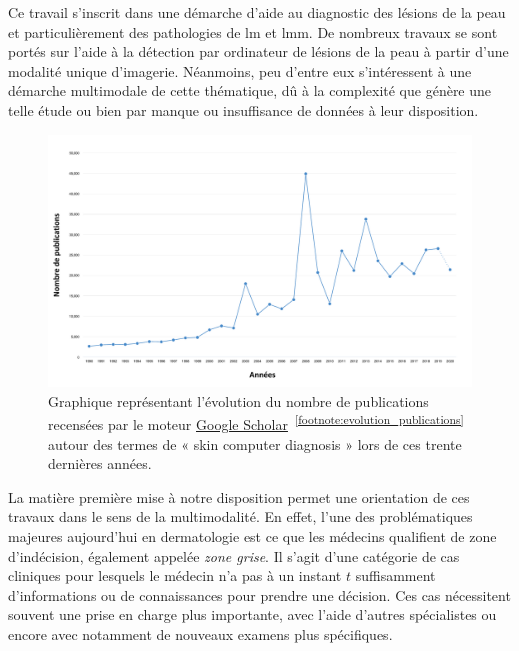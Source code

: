 Ce travail s'inscrit dans une démarche d'aide au diagnostic des lésions de la peau et particulièrement des pathologies de \gls{lm} et \gls{lmm}. De nombreux travaux se sont portés sur l'aide à la détection par ordinateur de lésions de la peau à partir d'une modalité unique d'imagerie. Néanmoins, peu d'entre eux s'intéressent à une démarche multimodale de cette thématique, dû à la complexité que génère une telle étude ou bien par manque ou insuffisance de données à leur disposition.\par

\begin{figure}[H]
    \centering
    \includegraphics[width=\linewidth]{contents/i_introduction/resources/evolution_publications.pdf}
    \caption{Graphique représentant l'évolution du nombre de publications recensées par le moteur \href{https://scholar.google.fr/}{Google Scholar}~\textsuperscript{\ref{footnote:evolution_publications}} autour des termes de « skin computer diagnosis » lors de ces trente dernières années.}
    \label{fig:evolution_publications}
\end{figure}\par
\addtocounter{footnote}{1}

La matière première mise à notre disposition permet une orientation de ces travaux dans le sens de la multimodalité. En effet, l'une des problématiques majeures aujourd'hui en dermatologie est ce que les médecins qualifient de zone d'indécision, également appelée \textit{zone grise}. Il s'agit d'une catégorie de cas cliniques pour lesquels le médecin n'a pas à un instant $t$ suffisamment d'informations ou de connaissances pour prendre une décision. Ces cas nécessitent souvent une prise en charge plus importante, avec l'aide d'autres spécialistes ou encore avec notamment de nouveaux examens plus spécifiques.\par

